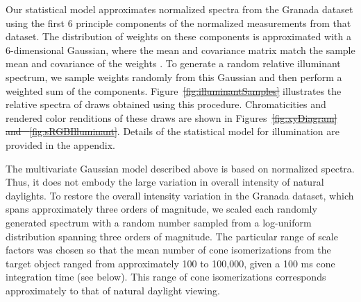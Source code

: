 \documentclass{jov}
\providecommand{\DIFaddtex}[1]{{\protect\color{blue}\uwave{#1}}} %
\providecommand{\DIFdeltex}[1]{{\protect\color{red}\sout{#1}}}                      %
\providecommand{\DIFaddbegin}{} %
\providecommand{\DIFaddend}{} %
\providecommand{\DIFdelbegin}{} %
\providecommand{\DIFdelend}{} %
\providecommand{\DIFadd}[1]{\texorpdfstring{\DIFaddtex{#1}}{#1}} %
\providecommand{\DIFdel}[1]{\texorpdfstring{\DIFdeltex{#1}}{}} %
\newcommand{\DIFscaledelfig}{0.5}
\newlength{\DIFdelgraphicswidth} %
\newlength{\DIFdelgraphicsheight} %
\newcommand{\DIFaddincludegraphics}[2][]{{\color{blue}\fbox{\DIFOincludegraphics[#1]{#2}}}} %
\newcommand{\DIFdelincludegraphics}[2][]{%
\sbox{\DIFdelgraphicsbox}{\DIFOincludegraphics[#1]{#2}}%
\settoboxwidth{\DIFdelgraphicswidth}{\DIFdelgraphicsbox} %
\settoboxtotalheight{\DIFdelgraphicsheight}{\DIFdelgraphicsbox} %
\scalebox{\DIFscaledelfig}{%
\parbox[b]{\DIFdelgraphicswidth}{\usebox{\DIFdelgraphicsbox}\\[-\baselineskip] \rule{\DIFdelgraphicswidth}{0em}}\llap{\resizebox{\DIFdelgraphicswidth}{\DIFdelgraphicsheight}{%
\setlength{\unitlength}{\DIFdelgraphicswidth}%
\begin{picture}(1,1)%
\thicklines\linethickness{2pt} %
{\color[rgb]{1,0,0}\put(0,0){\framebox(1,1){}}}%
{\color[rgb]{1,0,0}\put(0,0){\line( 1,1){1}}}%
{\color[rgb]{1,0,0}\put(0,1){\line(1,-1){1}}}%
\end{picture}%
}\hspace*{3pt}}} %
} %
\DeclareRobustCommand{\DIFaddbegin}{\DIFOaddbegin \let\includegraphics\DIFaddincludegraphics} %
\DeclareRobustCommand{\DIFaddend}{\DIFOaddend \let\includegraphics\DIFOincludegraphics} %
\DeclareRobustCommand{\DIFdelbegin}{\DIFOdelbegin \let\includegraphics\DIFdelincludegraphics} %
\DeclareRobustCommand{\DIFdelend}{\DIFOaddend \let\includegraphics\DIFOincludegraphics} %
\begin{document}
Our statistical model approximates normalized spectra from the Granada dataset using the first 6 principle components of the normalized measurements from that dataset.
The distribution of weights on these components is approximated with a 6-dimensional Gaussian, where the mean and covariance matrix match the sample mean and covariance of the weights \cite{BrainardFreeman}. 
To generate a random relative illuminant spectrum, we sample weights randomly from this Gaussian and then perform a weighted sum of the components.
Figure~\DIFdelbegin \DIFdel{\ref{fig:illuminantSamples} }\DIFdelend \DIFaddbegin \DIFadd{\ref{fig:illuminant}b }\DIFaddend illustrates the relative spectra of draws obtained using this procedure.
Chromaticities and rendered color renditions of these draws are shown in Figures~\DIFdelbegin \DIFdel{\ref{fig:xyDiagram} and ~\ref{fig:sRGBIlluminant}}\DIFdelend \DIFaddbegin \DIFadd{\ref{fig:illuminant}c and ~\ref{fig:illuminant}d}\DIFaddend .
Details of the statistical model for illumination are provided in the appendix.

The multivariate Gaussian model described above is based on normalized spectra. 
Thus, it does not embody the large variation in overall intensity of natural daylights.
To restore the overall intensity variation in the Granada dataset, which spans approximately three orders of magnitude, we scaled each randomly generated spectrum with a random number sampled from a log-uniform distribution spanning three orders of magnitude.
The particular range of scale factors was chosen so that the mean number of cone isomerizations from the target object ranged from approximately 100 to 100,000, given a 100 ms cone integration time (see below).
This range of cone isomerizations corresponds approximately to that of natural daylight viewing.
\end{document}
